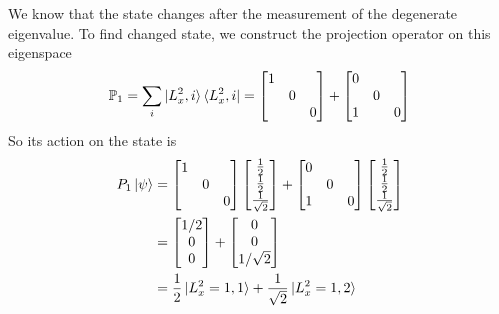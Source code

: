 \documentclass[../../../main.tex]{subfiles}
\begin{document}
We know that the state changes after the measurement of the degenerate eigenvalue.
To find changed state, we construct the projection operator on this eigenspace
\begin{equation*}
    \mathbb{P }_1=\sum_i \ket{L_x^2,i}\bra{L_x^2,i} =
    \begin{bmatrix}
        1 &   &   \\
          & 0 &   \\
          &   & 0 \\
    \end{bmatrix}
    +
    \begin{bmatrix}
        0 &   &   \\
          & 0 &   \\
        1 &   & 0 \\
    \end{bmatrix}
\end{equation*}
So its action on the state is
\begin{align*}
    P_1 \ket{\psi} & =   \begin{bmatrix}
                             1 &   &   \\
                               & 0 &   \\
                               &   & 0
                         \end{bmatrix}
    \begin{bmatrix}
        \frac{1 }{2} \\ \frac{1 }{2} \\ \frac{1 }{\sqrt{2}}
    \end{bmatrix}
    +
    \begin{bmatrix}
        0 &   &   \\
          & 0 &   \\
        1 &   & 0
    \end{bmatrix}
    \begin{bmatrix}
        \frac{1 }{2} \\ \frac{1 }{2} \\ \frac{1 }{\sqrt{2}}
    \end{bmatrix}                   \\
                   & =
    \begin{bmatrix}
        1/2 \\0\\0
    \end{bmatrix}
    +
    \begin{bmatrix}
        0 \\0\\1/\sqrt{2 }
    \end{bmatrix}                                                                   \\
                   & = \frac{1 }{2 }\ket{L_x^2=1,1}+\frac{1 }{\sqrt{2 }}\ket{L_x^2=1,2}
\end{align*}
\end{document}
